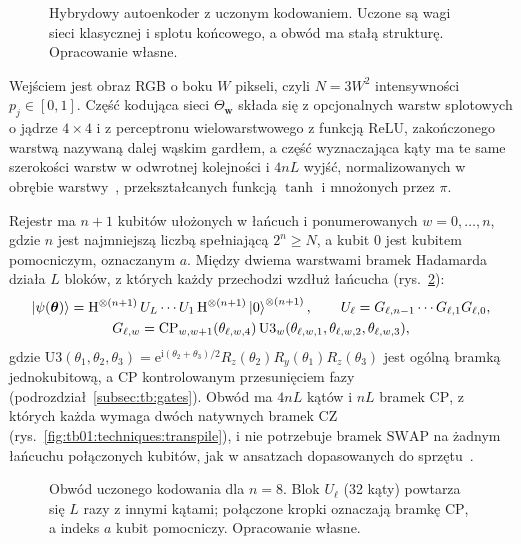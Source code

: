 \begin{figure}[tb]
\centering

\caption[Hybrydowy autoenkoder z uczonym kodowaniem]{Hybrydowy autoenkoder z uczonym kodowaniem. Uczone są wagi sieci klasycznej i splotu końcowego, a obwód ma stałą strukturę. Opracowanie własne.}
\label{fig:le:architecture}
\end{figure}

Wejściem jest obraz RGB o boku $W$ pikseli, czyli $N=3W^2$ intensywności $p_j\in[0,1]$.
Część kodująca sieci $\Theta_{\mathbf{w}}$ składa się z opcjonalnych warstw splotowych o jądrze $4\times4$ i z perceptronu wielowarstwowego z funkcją ReLU, zakończonego warstwą nazywaną dalej wąskim gardłem, a część wyznaczająca kąty ma te same szerokości warstw w odwrotnej kolejności i $4nL$ wyjść, normalizowanych w obrębie warstwy~\cite{ba_layer_2016}, przekształcanych funkcją $\tanh$ i mnożonych przez $\pi$.

Rejestr ma $n+1$ kubitów ułożonych w łańcuch i ponumerowanych $w=0,\dots,n$, gdzie $n$ jest najmniejszą liczbą spełniającą $2^n\ge N$, a kubit $0$ jest kubitem pomocniczym, oznaczanym $a$.
Między dwiema warstwami bramek Hadamarda działa $L$ bloków, z których każdy przechodzi wzdłuż łańcucha (rys.~\ref{fig:le:circuit}):
\begin{equation}\label{eq:le:state}
\begin{gathered}
\ket{\psi(\boldsymbol{\theta})}=\mathrm{H}^{\otimes(n+1)}\,U_L\cdots U_1\,\mathrm{H}^{\otimes(n+1)}\ket{0}^{\otimes(n+1)},
\qquad
U_\ell=G_{\ell,n-1}\cdots G_{\ell,1}G_{\ell,0},
\\
G_{\ell,w}=\mathrm{CP}_{w,w+1}(\theta_{\ell,w,4})\,\mathrm{U3}_{w}(\theta_{\ell,w,1},\theta_{\ell,w,2},\theta_{\ell,w,3}),
\end{gathered}
\end{equation}
gdzie $\mathrm{U3}(\theta_1,\theta_2,\theta_3)=\mathrm{e}^{\mathrm{i}(\theta_2+\theta_3)/2}R_z(\theta_2)R_y(\theta_1)R_z(\theta_3)$ jest ogólną bramką jednokubitową, a $\mathrm{CP}$ kontrolowanym przesunięciem fazy (podrozdział~\ref{subsec:tb:gates}).
Obwód ma $4nL$ kątów i $nL$ bramek $\mathrm{CP}$, z których każda wymaga dwóch natywnych bramek CZ (rys.~\ref{fig:tb01:techniques:transpile}), i nie potrzebuje bramek $\mathrm{SWAP}$ na żadnym łańcuchu połączonych kubitów, jak w ansatzach dopasowanych do sprzętu~\cite{kandala_hardware-efficient_2017}.

\begin{figure}[tb]
\centering

\caption[Obwód uczonego kodowania z jednym blokiem ansatzu]{Obwód uczonego kodowania dla $n=8$. Blok $U_\ell$ (32 kąty) powtarza się $L$ razy z innymi kątami; połączone kropki oznaczają bramkę $\mathrm{CP}$, a indeks $a$ kubit pomocniczy. Opracowanie własne.}
\label{fig:le:circuit}
\end{figure}

